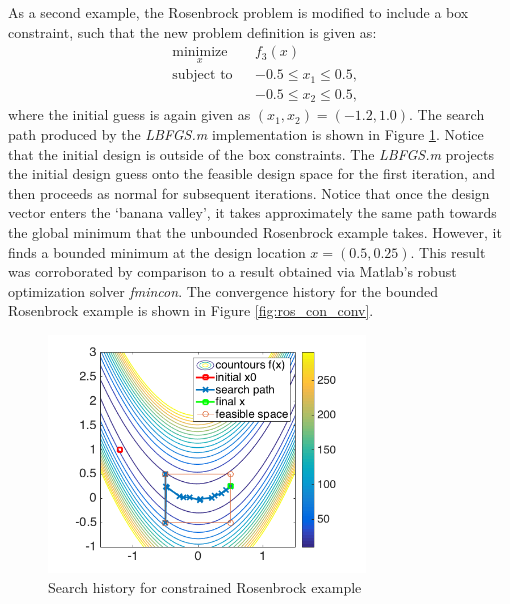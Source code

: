 \documentclass[11pt]{article}
\begin{document}
As a second example, the Rosenbrock problem is modified
to include a box constraint, such that the new problem
definition is given as:
\begin{equation}
\begin{aligned}
& \underset{x}{\text{minimize}}
& & f_3(x) \\
& \text{subject to}
& & -0.5 \leq x_1 \leq 0.5, \\
& & & -0.5 \leq x_2 \leq 0.5,
\end{aligned}
\end{equation}
%
where the initial guess is again given as
$(x_1, x_2) = (-1.2, 1.0)$.
The search path produced by the \emph{LBFGS.m} implementation
is shown in Figure \ref{fig:rosenbrock_constrained}. Notice
that the initial design is outside of the box constraints.
The \emph{LBFGS.m} projects the initial design guess onto
the feasible design space for the first iteration, and then
proceeds as normal for subsequent iterations. Notice
that once the design vector enters the `banana valley',
it takes approximately the same path towards the global
minimum that the unbounded Rosenbrock example takes.
However, it finds a bounded minimum at the design location
$x = (0.5,0.25)$. This result was corroborated by
comparison to a result obtained via Matlab's robust optimization
solver \emph{fmincon}. The convergence history for the
bounded Rosenbrock example is shown in Figure \ref{fig:ros_con_conv}.
%
\begin{figure}[hbt]
\centering
\includegraphics[width=0.75\textwidth]{rosenbrock_bounded}
\caption{Search history for constrained Rosenbrock example}
\label{fig:rosenbrock_constrained}
\end{figure}
%
\end{document}
